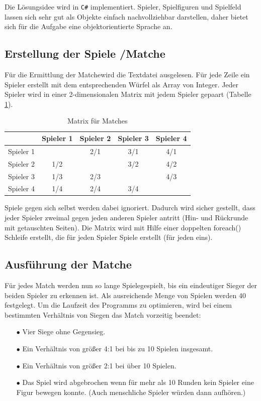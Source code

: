 \documentclass[a4paper,11pt,ngerman]{scrartcl}
\begin{document}
Die Lösungsidee wird in \texttt{C\#} implementiert. Spieler, Spielfiguren und Spielfeld lassen sich sehr gut als Objekte einfach nachvollziehbar darstellen, daher bietet sich für die Aufgabe eine objektorientierte Sprache an.
\subsection{Erstellung der Spiele /\glqq Matche\grqq} 
Für die Ermittlung der \glqq Matche\grqq\space wird die Textdatei ausgelesen. Für jede Zeile ein Spieler erstellt mit dem entsprechenden Würfel als Array von Integer. Jeder Spieler wird in einer 2-dimensionalen Matrix mit jedem Spieler gepaart (Tabelle \ref{table:Matrix}).
\begin{table}	
	\centering
	\begin{tabular}{|c|c|c|c|c|}	
		\hline
		& Spieler 1 & Spieler 2 & Spieler 3 & Spieler 4\\
		\hline
		Spieler 1 &\cellcolor{mygray}& 2/1 & 3/1 & 4/1 \\	
		\hline
		Spieler 2 & 1/2 & \cellcolor{mygray} & 3/2 & 4/2 \\
		\hline
		Spieler 3 & 1/3 & 2/3 &\cellcolor{mygray}& 4/3 \\
		\hline
		Spieler 4 & 1/4 & 2/4 & 3/4 & \cellcolor{mygray} \\
		\hline
	\end{tabular}
	\caption{Matrix für Matches}
	\label{table:Matrix}
\end{table}
Spiele gegen sich selbst werden dabei ignoriert. Dadurch wird sicher gestellt, dass jeder Spieler zweimal gegen jeden anderen Spieler antritt (Hin- und Rückrunde mit getauschten Seiten). Die Matrix wird mit Hilfe einer doppelten foreach() Schleife erstellt, die für jeden Spieler Spiele erstellt (für jeden eins).
\subsection{Ausführung der \glqq Matche\grqq}
Für jedes Match werden nun so lange \glqq Spiele\grqq \space gespielt, bis ein eindeutiger Sieger der beiden Spieler zu erkennen ist. Als ausreichende Menge von Spielen werden 40 festgelegt. Um die Laufzeit des Programms zu optimieren, wird bei einem bestimmten Verhältnis von Siegen das Match vorzeitig beendet:
\begin{enumerate}
	\item[$\bullet$] Vier Siege ohne Gegensieg.	
	\item[$\bullet$] Ein Verhältnis von größer 4:1 bei bis zu 10 Spielen insgesamt.
	\item[$\bullet$] Ein Verhältnis von größer 2:1 bei über 10 Spielen. 
	\item[$\bullet$] Das Spiel wird abgebrochen wenn für mehr als 10 Runden kein Spieler eine Figur bewegen konnte. (Auch menschliche Spieler würden dann aufhören.)
\end{enumerate}
\end{document}
